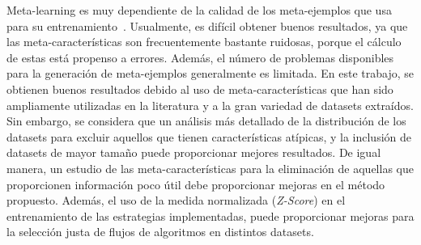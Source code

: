 Meta-learning es muy dependiente de la calidad de los meta-ejemplos que usa para su entrenamiento~\cite{gomes2012combining}. Usualmente, es difícil obtener buenos resultados, ya que las meta-características son frecuentemente bastante ruidosas, porque el cálculo de estas está propenso a errores. Además, el número de problemas disponibles para la generación de meta-ejemplos generalmente es limitada. En este trabajo, se obtienen buenos resultados debido al uso de meta-características que han sido ampliamente utilizadas en la literatura y a la gran variedad de datasets extraídos. Sin embargo, se considera que un análisis más detallado de la distribución de los datasets para excluir aquellos que tienen características atípicas, y la inclusión de datasets de mayor tamaño puede proporcionar mejores resultados. De igual manera, un estudio de las meta-características para la eliminación de aquellas que proporcionen información poco útil debe proporcionar mejoras en el método propuesto. Además, el uso de la medida normalizada (\textit{Z-Score}) en el entrenamiento de las estrategias implementadas, puede proporcionar mejoras para la selección justa de flujos de algoritmos en distintos datasets.





